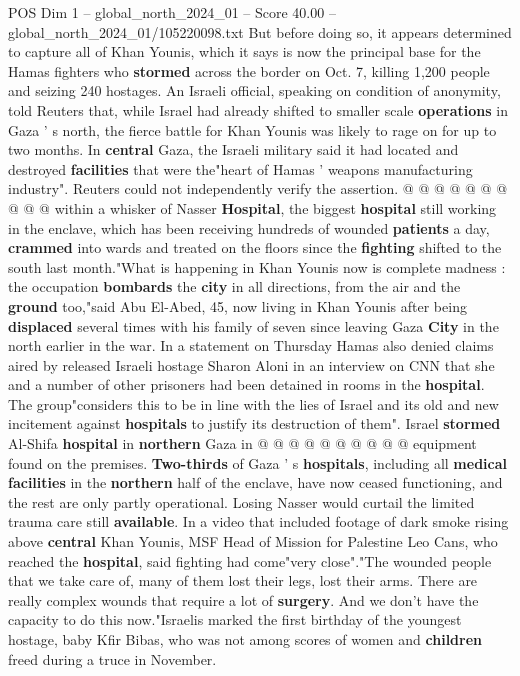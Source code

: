 \begin{textsample}{POS Dim 1 – global\_north\_2024\_01 – Score 40.00 – global\_north\_2024\_01/105220098.txt}
But before doing so, it appears determined to capture all of Khan Younis, which it says is now the principal base for the Hamas fighters who \textbf{stormed} across the border on Oct. 7, killing 1,200 people and seizing 240 hostages.
An Israeli official, speaking on condition of anonymity, told Reuters that, while Israel had already shifted to smaller scale \textbf{operations} in Gaza ' s north, the fierce battle for Khan Younis was likely to rage on for up to two months.
In \textbf{central} Gaza, the Israeli military said it had located and destroyed \textbf{facilities} that were the"heart of Hamas ' weapons manufacturing industry".
Reuters could not independently verify the assertion. @ @ @ @ @ @ @ @ @ @ within a whisker of Nasser \textbf{Hospital}, the biggest \textbf{hospital} still working in the enclave, which has been receiving hundreds of wounded \textbf{patients} a day, \textbf{crammed} into wards and treated on the floors since the \textbf{fighting} shifted to the south last month."What is happening in Khan Younis now is complete madness : the occupation \textbf{bombards} the \textbf{city} in all directions, from the air and the \textbf{ground} too,"said Abu El-Abed, 45, now living in Khan Younis after being \textbf{displaced} several times with his family of seven since leaving Gaza \textbf{City} in the north earlier in the war.
In a statement on Thursday Hamas also denied claims aired by released Israeli hostage Sharon Aloni in an interview on CNN that she and a number of other prisoners had been detained in rooms in the \textbf{hospital}.
The group"considers this to be in line with the lies of Israel and its old and new incitement against \textbf{hospitals} to justify its destruction of them".
Israel \textbf{stormed} Al-Shifa \textbf{hospital} in \textbf{northern} Gaza in @ @ @ @ @ @ @ @ @ @ equipment found on the premises. \textbf{Two-thirds} of Gaza ' s \textbf{hospitals}, including all \textbf{medical} \textbf{facilities} in the \textbf{northern} half of the enclave, have now ceased functioning, and the rest are only partly operational.
Losing Nasser would curtail the limited trauma care still \textbf{available}.
In a video that included footage of dark smoke rising above \textbf{central} Khan Younis, MSF Head of Mission for Palestine Leo Cans, who reached the \textbf{hospital}, said fighting had come"very close"."The wounded people that we take care of, many of them lost their legs, lost their arms.
There are really complex wounds that require a lot of \textbf{surgery}.
And we don't have the capacity to do this now."Israelis marked the first birthday of the youngest hostage, baby Kfir Bibas, who was not among scores of women and \textbf{children} freed during a truce in November.

\end{textsample}
